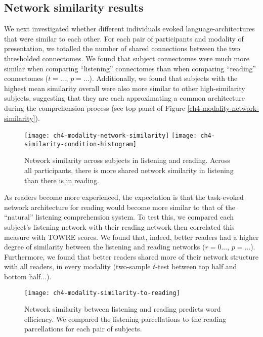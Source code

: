 \subsection{Network similarity results}

We next investigated whether different individuals evoked language-architectures that were similar to each other. For each pair of participants and modality of presentation, we totalled the number of shared connections between the two thresholded connectomes. We found that subject connectomes were much more similar when comparing ``listening'' connectomes than when comparing ``reading'' connectomes ($t = ...$, $p = ...$). Additionally, we found that subjects with the highest mean similarity overall were also more similar to other high-similarity subjects, suggesting that they are each approximating a common architecture during the comprehension process (see top panel of Figure \ref{ch4-modality-network-similarity}).

\begin{figure}[t]
	\centering
	\texttt{[image: ch4-modality-network-similarity]}
	\texttt{[image: ch4-similarity-condition-histogram]}
    \caption[Network similarity across subjects in listening and reading.] {Network similarity across subjects in listening and reading. Across all participants, there is more shared network similarity in listening than there is in reading.}
	\label{fig:ch4-modality-network-similarity}
\end{figure}

As readers become more experienced, the expectation is that the task-evoked network architecture for reading would become more similar to that of the ``natural'' listening comprehension system. To test this, we compared each subject's listening network with their reading network then correlated this measure with TOWRE scores. We found that, indeed, better readers had a higher degree of similarity between the listening and reading networks ($r = 0...$, $p = ...$). Furthermore, we found that better readers shared more of their network structure with all readers, in every modality (two-sample $t$-test between top half and bottom half...). 

\begin{figure}[t]
	\centering
	\texttt{[image: ch4-modality-similarity-to-reading]}
    \caption[Network similarity between listening and reading predicts word efficiency.]{Network similarity between listening and reading predicts word efficiency. We compared the listening parcellations to the reading parcellations for each pair of subjects.}
	\label{fig:ch4-modality-similarity-to-reading}
\end{figure}

